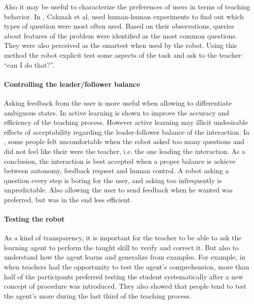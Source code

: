 Also it may be useful to characterize the preferences of users in terms of teaching behavior. In \cite{cakmak2012designing}, Cakmak et al. used human-human experiments to find out which types of question were most often used. Based on their observations, queries about features of the problem were identified as the most common questions. They were also perceived as the smartest when used by the robot. Using this method the robot explicit test some aspects of the task and ask to the teacher: ``can I do that?''.

\paragraph{Controlling the leader/follower balance} Asking feedback from the user is more useful when allowing to differentiate ambiguous states. In \cite{chao2010transparent} active learning is shown to improve the accuracy and efficiency of the teaching process. However active learning may illicit undesirable effects of acceptability regarding the leader-follower balance of the interaction. In \cite{chao2010transparent}, some people felt uncomfortable when the robot asked too many questions and did not feel like their were the teacher, i.e. the one leading the interaction. As a conclusion, the interaction is best accepted when a proper balance is achieve between autonomy, feedback request and human control. A robot asking a question every step is boring for the user, and asking too infrequently is unpredictable. Also allowing the user to send feedback when he wanted was preferred, but was in the end less efficient.


\paragraph{Testing the robot} As a kind of transparency, it is important for the teacher to be able to ask the learning agent to perform the taught skill to verify and correct it. But also to understand how the agent learns and generalize from examples. For example, in \cite{kaochar2011towards} when teachers had the opportunity to test the agent's comprehension, more than half of the participants preferred testing the student systematically after a new concept of procedure was introduced. They also showed that people tend to test the agent's more during the last third of the teaching process.

